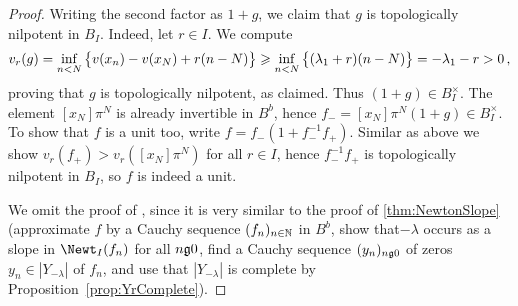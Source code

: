\documentclass[a4paper, 10pt, oneside, DIV=9, chapterprefix=true, numbers=enddot,bibliography=totoc]{scrbook}
\begin{document}
\begin{proof}
	Writing the second factor as $1+g$, we claim that $g$ is topologically nilpotent in $B_I$. Indeed, let $r\in I$. We compute
	\begin{equation*}
		v_r(g)=\mathop{\operatorname{\mathrm{inf}}}_{n<N}\big\{v(x_n)-v(x_N)+r(n-N)\big\}\geqslant \mathop{\operatorname{\mathrm{inf}}}_{n<N}\big\{(\lambda_1+r)(n-N)\big\}=-\lambda_1-r>0\,,
	\end{equation*}
	proving that $g$ is topologically nilpotent, as claimed. Thus $(1+g)\in B_I^\times$. The element $[x_N]\pi^N$ is already invertible in $B^b$, hence $f_-=[x_N]\pi^N(1+g)\in B_I^\times$. To show that $f$ is a unit too, write $f=f_-(1+f_-^{-1}f_+)$. Similar as above we show $v_r(f_+)>v_r([x_N]\pi^N)$ for all $r\in I$, hence $f_-^{-1}f_+$ is topologically nilpotent in $B_I$, so $f$ is indeed a unit.
	
	We omit the proof of , since it is very similar to the proof of \cref{thm:NewtonSlope} (approximate $f$ by a Cauchy sequence $(f_n)_{n\in\mathbb{N}}$ in $B^b$, show that$-\lambda$ occurs as a slope in $\Newt_I(f_n)$ for all $n\gge 0$, find a Cauchy sequence $(y_n)_{n\gge 0}$ of zeros $y_n\in |Y_{-\lambda}|$ of $f_n$, and use that $|Y_{-\lambda}|$ is complete by Proposition~\cref{prop:YrComplete}).
\end{proof}
\end{document}
